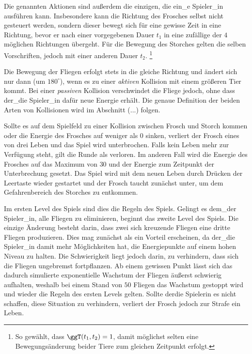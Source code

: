 Die genannten Aktionen sind außerdem die einzigen, die ein\_e Spieler\_in ausführen kann. Insbesondere kann die Richtung des Frosches selbst nicht gesteuert werden, sondern dieser bewegt sich für eine gewisse Zeit in eine Richtung, bevor er nach einer vorgegebenen Dauer $t_1$ in eine zufällige der $4$ möglichen Richtungen übergeht. Für die Bewegung des Storches gelten die selben Vorschriften, jedoch mit einer anderen Dauer $t_2$. \footnote{So gewählt, dass $\ggT (t_1,t_2) = 1$, damit möglichst selten eine Bewegungsänderung beider Tiere zum gleichen Zeitpunkt erfolgt.}

Die Bewegung der Fliegen erfolgt stets in die gleiche Richtung und ändert sich nur dann (um $180^{\circ}$), wenn es zu einer \textit{aktiven} Kollision mit einem größeren Tier kommt. Bei einer \textit{passiven} Kollision verschwindet die Fliege jedoch, ohne dass der\_die Spieler\_in dafür neue Energie erhält. Die genaue Definition der beiden Arten von Kollisionen wird im Abschnitt (...) folgen.

Sollte es auf dem Spielfeld zu einer Kollision zwischen Frosch und Storch kommen oder die Energie des Frosches auf weniger als $0$ sinken, verliert der Frosch eines von drei Leben und das Spiel wird unterbrochen. Falls kein Leben mehr zur Verfügung steht, gilt die Runde als verloren. Im anderen Fall wird die Energie des Frosches auf das Maximum von $30$ und der Energie zum Zeitpunkt der Unterbrechung gesetzt. Das Spiel wird mit dem neuen Leben durch Drücken der Leertaste wieder gestartet und der Frosch taucht zunächst unter, um dem Gefahrenbereich des Storches zu entkommen.

Im ersten Level des Spiels sind dies die Regeln des Spiels. Gelingt es dem\_der Spieler\_in, alle Fliegen zu eliminieren, beginnt das zweite Level des Spiels. Die einzige Änderung besteht darin, dass zwei sich kreuzende Fliegen eine dritte Fliegen produzieren. Dies mag zunächst als ein Vorteil erscheinen, da der\_die Spieler\_in damit mehr Möglichkeiten hat, die Energiepunkte auf einem hohen Niveau zu halten. Die Schwierigkeit liegt jedoch darin, zu verhindern, dass sich die Fliegen ungebremst fortpflanzen. Ab einem gewissen Punkt lässt sich das dadurch simulierte exponentielle Wachstum der Fliegen äußerst schwierig aufhalten, weshalb bei einem Stand von $50$ Fliegen das Wachstum gestoppt wird und wieder die Regeln des ersten Levels gelten. Sollte der\textunderscore die Spieler\textunderscore in es nicht schaffen, diese Situation zu verhindern, verliert der Frosch jedoch zur Strafe ein Leben.


